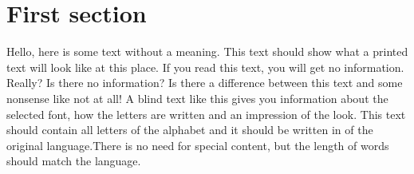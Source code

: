 \documentclass[a4paper,14pt]{extarticle}
\begin{document}

    \section{First section}

    Hello, here is some text without a meaning.  This text should show what 
    a printed text will look like at this place.  If you read this text, 
    you will get no information.  Really?  Is there no information?  Is there 
    a difference between this text and some nonsense like not at all!  A 
    blind text like this gives you information about the selected font, how 
    the letters are written and an impression of the look.  This text should
    contain all letters of the alphabet and it should be written in of the
    original language.There is no need for special content, but the length of
    words should match the language.
\end{document}
